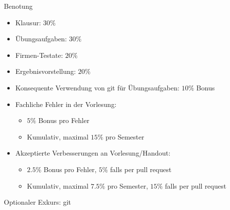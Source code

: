 \documentclass[aspectratio=169,t]{beamer}
\begin{document}
\begin{frame}{Benotung}
 \begin{itemize}
     \item<1-> Klausur: $30\%$
     \item<1-> Übungsaufgaben: $30\%$
     \item<1-> Firmen-Testate: $20\%$
     \item<1-> Ergebnisvorstellung: $20\%$
     \item<2-> Konsequente Verwendung von git für Übungsaufgaben: $10\%$ Bonus
     \item<3-> Fachliche Fehler in der Vorlesung:
     \begin{itemize}
         \item $5\%$ Bonus pro Fehler 
         \item Kumulativ, maximal $15\%$ pro Semester
     \end{itemize} 
     \item<4-> Akzeptierte Verbesserungen an Vorlesung/Handout:
     \begin{itemize}
         \item $2.5\%$ Bonus pro Fehler, $5\%$ falls per pull request
         \item Kumulativ, maximal $7.5\%$ pro Semester, $15\%$ falls per pull request
     \end{itemize} 
 \end{itemize}
\end{frame}

\begin{frame}{Optionaler Exkurs: git}
    
\end{frame}
\end{document}
